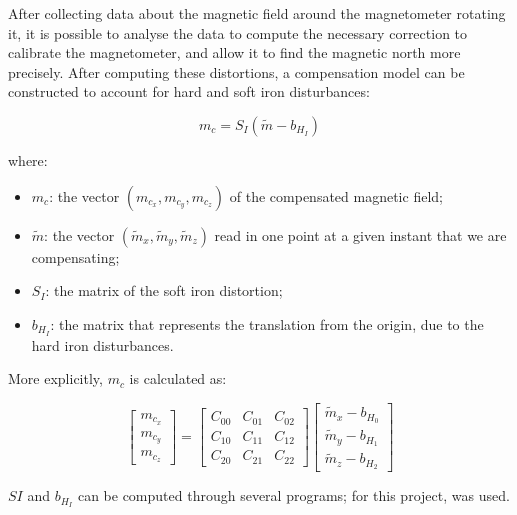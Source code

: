 \documentclass[]{article}
\begin{document}
After collecting data about the magnetic field around the magnetometer rotating it, it is possible to analyse the data to compute the necessary correction to calibrate the magnetometer, and allow it to find the magnetic north more precisely. After computing these distortions, a compensation model can be constructed to account for hard and soft iron disturbances:

$$ m_c = S_I(\tilde{m} - b_{H_I}) $$

where:

\begin{itemize}
	\item $m_c$: the vector $(m_{c_x}, m_{c_y}, m_{c_z})$ of the compensated magnetic field;
	\item $\tilde{m}$: the vector $(\tilde{m}_x, \tilde{m}_y, \tilde{m}_z)$ read in one point at a given instant that we are compensating;
	\item $S_I$: the matrix of the soft iron distortion;
	\item $b_{H_I}$: the matrix that represents the translation from the origin, due to the hard iron disturbances. 
\end{itemize}

More explicitly, $m_c$ is calculated as:

	\[ \left[ \begin{array}{c}
	m_{c_x} \\
	m_{c_y} \\
	m_{c_z} \end{array} \right]
	 = 
	\left[ \begin{array}{ccc}
	C_{00} & C_{01} & C_{02} \\
	C_{10} & C_{11} & C_{12} \\
	C_{20} & C_{21} & C_{22} \end{array} \right]
	\left[ \begin{array}{c}
	\tilde{m}_x - b_{H_0} \\
	\tilde{m}_y - b_{H_1} \\
	\tilde{m}_z - b_{H_2} \end{array} \right]
	\] 

$SI$ and $b_{H_I}$ can be computed through several programs; for this project, \cite{calibsw} was used.
\end{document}

